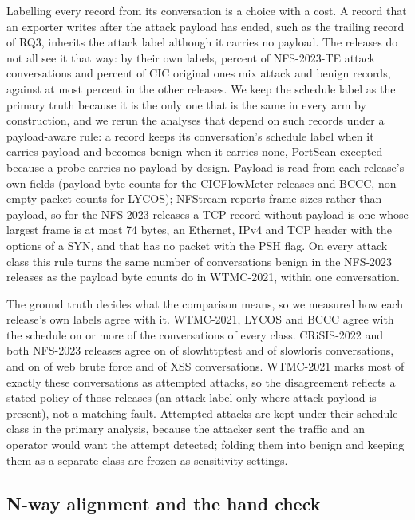 \documentclass[pdflatex,sn-mathphys-num]{sn-jnl}
\newcommand{\setnum}[1]{#1}
\theoremstyle{thmstyleone}%
\theoremstyle{thmstylethree}%
\begin{document}
Labelling every record from its conversation is a choice with a cost. A record that an exporter writes after the attack payload has ended, such as the trailing record of RQ3, inherits the attack label although it carries no payload. The releases do not all see it that way: by their own labels, \NmixedTe{} percent of NFS-2023-TE attack conversations and \NmixedOrig{} percent of CIC original ones mix attack and benign records, against at most \NmixedOtherMax{} percent in the other releases. We keep the schedule label as the primary truth because it is the only one that is the same in every arm by construction, and we rerun the analyses that depend on such records under a payload-aware rule: a record keeps its conversation's schedule label when it carries payload and becomes benign when it carries none, PortScan excepted because a probe carries no payload by design. Payload is read from each release's own fields (payload byte counts for the CICFlowMeter releases and BCCC, non-empty packet counts for LYCOS); NFStream reports frame sizes rather than payload, so for the NFS-2023 releases a TCP record without payload is one whose largest frame is at most \setnum{74} bytes, an Ethernet, IPv4 and TCP header with the options of a SYN, and that has no packet with the PSH flag. On every attack class this rule turns the same number of conversations benign in the NFS-2023 releases as the payload byte counts do in WTMC-2021, within one conversation.

The ground truth decides what the comparison means, so we measured how each release's own labels agree with it. WTMC-2021, LYCOS and BCCC agree with the schedule on \NlabelGoodMin{} or more of the conversations of every class. CRiSIS-2022 and both NFS-2023 releases agree on \NlabelSlowhttp{} of slowhttptest and \NlabelSlowloris{} of slowloris conversations, and on \NlabelWebBf{} of web brute force and \NlabelXss{} of XSS conversations. WTMC-2021 marks most of exactly these conversations as attempted attacks, so the disagreement reflects a stated policy of those releases (an attack label only where attack payload is present), not a matching fault. Attempted attacks are kept under their schedule class in the primary analysis, because the attacker sent the traffic and an operator would want the attempt detected; folding them into benign and keeping them as a separate class are frozen as sensitivity settings.

\subsection{N-way alignment and the hand check}
\end{document}
